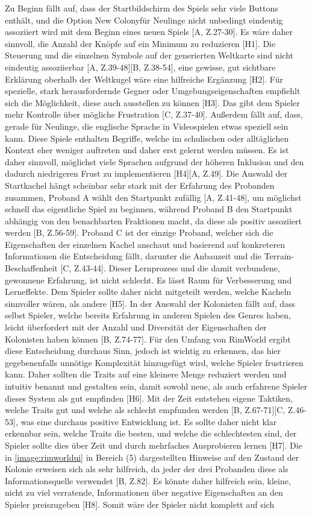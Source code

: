 Zu Beginn fällt auf, dass der Startbildschirm des Spiels sehr viele Buttons enthält, und die Option \glqq New Colony\grqq für Neulinge nicht unbedingt eindeutig assoziiert wird mit dem Beginn eines neuen Spiels [A, Z.27-30]. Es wäre daher sinnvoll, die Anzahl der Knöpfe auf ein Minimum zu reduzieren [H1]. Die Steuerung und die einzelnen Symbole auf der generierten Weltkarte sind nicht eindeutig assoziierbar [A, Z.39-48][B, Z.38-54], eine gewisse, gut sichtbare Erklärung oberhalb der Weltkugel wäre eine hilfreiche Ergänzung [H2]. Für spezielle, stark herausfordernde Gegner oder Umgebungseigenschaften empfiehlt sich die Möglichkeit, diese auch ausstellen zu können [H3]. Das gibt dem Spieler mehr Kontrolle über mögliche Frustration [C, Z.37-40]. Außerdem fällt auf, dass, gerade für Neulinge, die englische Sprache in Videospielen etwas speziell sein kann. Diese Spiele enthalten Begriffe, welche im schulischen oder alltäglichen Kontext eher weniger auftreten und daher erst gelernt werden müssen. Es ist daher sinnvoll, möglichst viele Sprachen aufgrund der höheren Inklusion und den dadurch niedrigeren Frust zu implementieren [H4][A, Z.49]. Die Auswahl der Startkachel hängt scheinbar sehr stark mit der Erfahrung des Probanden zusammen, Proband A wählt den Startpunkt zufällig [A, Z.41-48], um möglichst schnell das eigentliche Spiel zu beginnen, während Proband B den Startpunkt abhängig von den benachbarten Fraktionen macht, da diese als positiv assoziiert werden [B, Z.56-59]. Proband C ist der einzige Proband, welcher sich die Eigenschaften der einzelnen Kachel anschaut und basierend auf konkreteren Informationen die Entscheidung fällt, darunter die Anbauzeit und die Terrain-Beschaffenheit [C, Z.43-44]. Dieser Lernprozess und die damit verbundene, gewonnene Erfahrung, ist nicht schlecht. Es lässt Raum für Verbesserung und Lerneffekte. Dem Spieler sollte daher nicht mitgeteilt werden, welche Kacheln sinnvoller wären, als andere [H5]. In der Auswahl der Kolonisten fällt auf, dass selbst Spieler, welche bereits Erfahrung in anderen Spielen des Genres haben, leicht überfordert mit der Anzahl und Diversität der Eigenschaften der Kolonisten haben können [B, Z.74-77]. Für den Umfang von RimWorld ergibt diese Entscheidung durchaus Sinn, jedoch ist wichtig zu erkennen, das hier gegebenenfalls unnötige Komplexität hinzugefügt wird, welche Spieler frustrieren kann. Daher sollten die Traits auf eine kleinere Menge reduziert werden und intuitiv benannt und gestalten sein, damit sowohl neue, als auch erfahrene Spieler dieses System als gut empfinden [H6]. Mit der Zeit entstehen eigene Taktiken, welche Traits gut und welche als schlecht empfunden werden [B, Z.67-71][C, Z.46-53], was eine durchaus positive Entwicklung ist. Es sollte daher nicht klar erkennbar sein, welche Traits die besten, und welche die schlechtesten sind, der Spieler sollte dies über Zeit und durch mehrfaches Ausprobieren lernen [H7]. Die in \autoref{image:rimworldui} in Bereich (5) dargestellten Hinweise auf den Zustand der Kolonie erweisen sich als sehr hilfreich, da jeder der drei Probanden diese als Informationsquelle verwendet [B, Z.82]. Es könnte daher hilfreich sein, kleine, nicht zu viel verratende, Informationen über negative Eigenschaften an den Spieler preiszugeben [H8]. Somit wäre der Spieler nicht komplett auf sich 